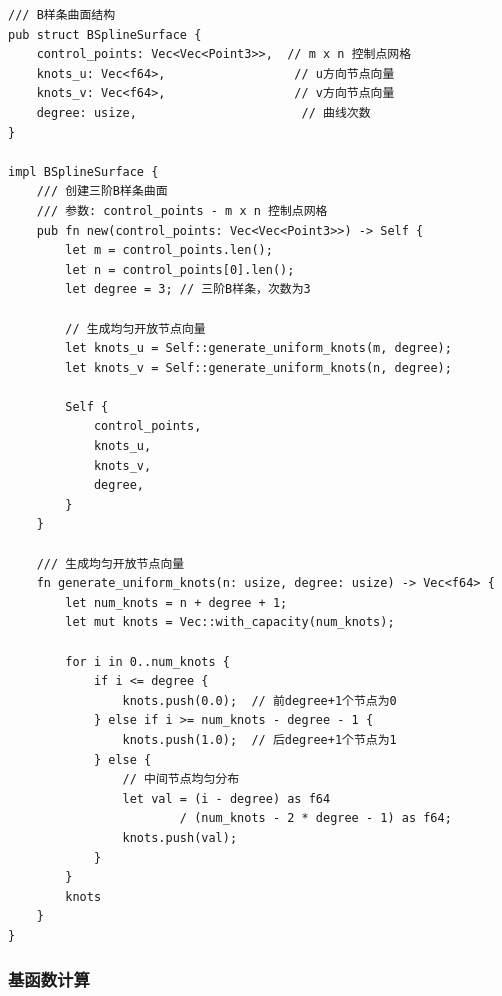 \documentclass[12pt,a4paper]{article}
\begin{document}
\begin{lstlisting}[style=ruststyle, caption={B样条曲面结构}]
/// B样条曲面结构
pub struct BSplineSurface {
    control_points: Vec<Vec<Point3>>,  // m x n 控制点网格
    knots_u: Vec<f64>,                  // u方向节点向量
    knots_v: Vec<f64>,                  // v方向节点向量
    degree: usize,                       // 曲线次数
}

impl BSplineSurface {
    /// 创建三阶B样条曲面
    /// 参数: control_points - m x n 控制点网格
    pub fn new(control_points: Vec<Vec<Point3>>) -> Self {
        let m = control_points.len();
        let n = control_points[0].len();
        let degree = 3; // 三阶B样条，次数为3

        // 生成均匀开放节点向量
        let knots_u = Self::generate_uniform_knots(m, degree);
        let knots_v = Self::generate_uniform_knots(n, degree);

        Self {
            control_points,
            knots_u,
            knots_v,
            degree,
        }
    }

    /// 生成均匀开放节点向量
    fn generate_uniform_knots(n: usize, degree: usize) -> Vec<f64> {
        let num_knots = n + degree + 1;
        let mut knots = Vec::with_capacity(num_knots);
        
        for i in 0..num_knots {
            if i <= degree {
                knots.push(0.0);  // 前degree+1个节点为0
            } else if i >= num_knots - degree - 1 {
                knots.push(1.0);  // 后degree+1个节点为1
            } else {
                // 中间节点均匀分布
                let val = (i - degree) as f64 
                        / (num_knots - 2 * degree - 1) as f64;
                knots.push(val);
            }
        }
        knots
    }
}
\end{lstlisting}

\subsubsection{基函数计算}
\end{document}
